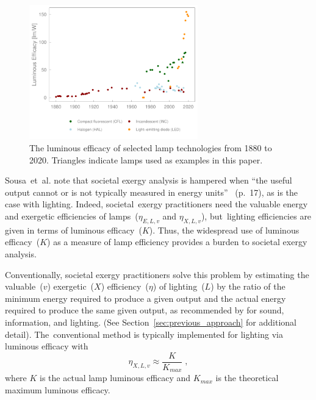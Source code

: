 \documentclass[energies,article,accept,moreauthors,pdftex]{Definitions/mdpi}\usepackage[]{graphicx}\usepackage[]{color}
\newenvironment{knitrout}{}{} %
\begin{document}
\begin{knitrout}
\color{fgcolor}\begin{figure}[H]

{\centering \includegraphics[width=0.65\textwidth]{figure/LuminousEfficacy_Graph-1} 

}

\caption[The luminous efficacy of selected lamp technologies from 1880 to 2020]{The luminous efficacy of selected lamp technologies from 1880 to 2020. Triangles indicate lamps used as examples in this paper.}
\label{fig:LuminousEfficacy_Graph}
\end{figure}


\end{knitrout}

Sousa~{et~al.} %
note that 
societal exergy analysis is hampered when 
``the useful output cannot or is not
typically measured in energy units''~\cite{Sousa2017}  (p.~17),
as is the case with lighting.
Indeed, \mbox{societal exergy} practitioners 
need the valuable energy and exergetic efficiencies 
of lamps~($\eta_{E,L,v}$ and $\eta_{X,L,v}$), 
\mbox{but lighting} efficiencies are given in 
terms of luminous efficacy~($K$).
Thus, the widespread use of luminous efficacy~($K$) as a measure of lamp efficiency 
provides a burden to societal exergy analysis.

Conventionally, societal exergy practitioners solve this problem by estimating
the valuable~($v$) exergetic~($X$) efficiency~($\eta$) of lighting~($L$) by the ratio of
the minimum energy required to produce a given output and
the actual energy required to produce the same given output, 
as recommended by \citet{Sousa2017}
for sound, information, and lighting.
(See Section~\ref{sec:previous_approach} for additional detail).
\mbox{The conventional} method is typically implemented 
for lighting via luminous efficacy with
\begin{equation} \label{eq:eta_eqn}
  \eta_{X,L,v} \approx \frac{K}{K_{max}} \; ,
\end{equation}
%
where $K$ is the actual lamp luminous efficacy and 
$K_{max}$ is the theoretical maximum luminous efficacy.
\end{document}
